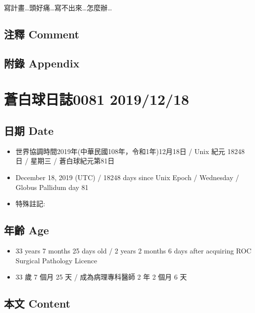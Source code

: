\documentclass[
]{article}
\providecommand{\tightlist}{%
  \setlength{\itemsep}{0pt}\setlength{\parskip}{0pt}}
\begin{document}
寫計畫\ldots 頭好痛\ldots 寫不出來\ldots 怎麼辦\ldots{}

\hypertarget{ux6ce8ux91cb-comment-15}{%
\subsection{注釋 Comment}\label{ux6ce8ux91cb-comment-15}}

\hypertarget{ux9644ux9304-appendix-16}{%
\subsection{附錄 Appendix}\label{ux9644ux9304-appendix-16}}

\hypertarget{ux84bcux767dux7403ux65e5ux8a8c0081-20191218}{%
\section{蒼白球日誌0081
2019/12/18}\label{ux84bcux767dux7403ux65e5ux8a8c0081-20191218}}

\hypertarget{ux65e5ux671f-date-17}{%
\subsection{日期 Date}\label{ux65e5ux671f-date-17}}

\begin{itemize}
\tightlist
\item
  世界協調時間2019年(中華民國108年，令和1年)12月18日 / Unix 紀元 18248
  日 / 星期三 / 蒼白球紀元第81日
\item
  December 18, 2019 (UTC) / 18248 days since Unix Epoch / Wednesday /
  Globus Pallidum day 81
\item
  特殊註記:
\end{itemize}

\hypertarget{ux5e74ux9f61-age-17}{%
\subsection{年齡 Age}\label{ux5e74ux9f61-age-17}}

\begin{itemize}
\tightlist
\item
  33 years 7 months 25 days old / 2 years 2 months 6 days after
  acquiring ROC Surgical Pathology Licence
\item
  33 歲 7 個月 25 天 / 成為病理專科醫師 2 年 2 個月 6 天
\end{itemize}

\hypertarget{ux672cux6587-content-17}{%
\subsection{本文 Content}\label{ux672cux6587-content-17}}
\end{document}
